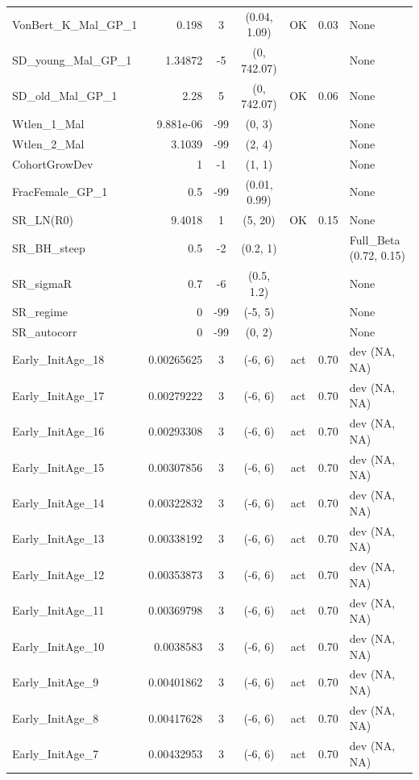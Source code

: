 \documentclass[12pt,]{article}
\begin{document}
\begin{landscape}
\begin{longtable}{lrcccll}
  VonBert\_K\_Mal\_GP\_1 & 0.198 & 3 & (0.04, 1.09) & OK & 0.03 & None \\ 
  SD\_young\_Mal\_GP\_1 & 1.34872 & -5 & (0, 742.07) &  &  & None \\ 
  SD\_old\_Mal\_GP\_1 & 2.28 & 5 & (0, 742.07) & OK & 0.06 & None \\ 
  Wtlen\_1\_Mal & 9.881e-06 & -99 & (0, 3) &  &  & None \\ 
  Wtlen\_2\_Mal & 3.1039 & -99 & (2, 4) &  &  & None \\ 
  CohortGrowDev & 1 & -1 & (1, 1) &  &  & None \\ 
  FracFemale\_GP\_1 & 0.5 & -99 & (0.01, 0.99) &  &  & None \\ 
  SR\_LN(R0) & 9.4018 & 1 & (5, 20) & OK & 0.15 & None \\ 
  SR\_BH\_steep & 0.5 & -2 & (0.2, 1) &  &  & Full\_Beta (0.72, 0.15) \\ 
  SR\_sigmaR & 0.7 & -6 & (0.5, 1.2) &  &  & None \\ 
  SR\_regime & 0 & -99 & (-5, 5) &  &  & None \\ 
  SR\_autocorr & 0 & -99 & (0, 2) &  &  & None \\ 
  Early\_InitAge\_18 & 0.00265625 & 3 & (-6, 6) & act & 0.70 & dev (NA, NA) \\ 
  Early\_InitAge\_17 & 0.00279222 & 3 & (-6, 6) & act & 0.70 & dev (NA, NA) \\ 
  Early\_InitAge\_16 & 0.00293308 & 3 & (-6, 6) & act & 0.70 & dev (NA, NA) \\ 
  Early\_InitAge\_15 & 0.00307856 & 3 & (-6, 6) & act & 0.70 & dev (NA, NA) \\ 
  Early\_InitAge\_14 & 0.00322832 & 3 & (-6, 6) & act & 0.70 & dev (NA, NA) \\ 
  Early\_InitAge\_13 & 0.00338192 & 3 & (-6, 6) & act & 0.70 & dev (NA, NA) \\ 
  Early\_InitAge\_12 & 0.00353873 & 3 & (-6, 6) & act & 0.70 & dev (NA, NA) \\ 
  Early\_InitAge\_11 & 0.00369798 & 3 & (-6, 6) & act & 0.70 & dev (NA, NA) \\ 
  Early\_InitAge\_10 & 0.0038583 & 3 & (-6, 6) & act & 0.70 & dev (NA, NA) \\ 
  Early\_InitAge\_9 & 0.00401862 & 3 & (-6, 6) & act & 0.70 & dev (NA, NA) \\ 
  Early\_InitAge\_8 & 0.00417628 & 3 & (-6, 6) & act & 0.70 & dev (NA, NA) \\ 
  Early\_InitAge\_7 & 0.00432953 & 3 & (-6, 6) & act & 0.70 & dev (NA, NA) \\ 

\end{longtable}
\end{landscape}
\end{document}
